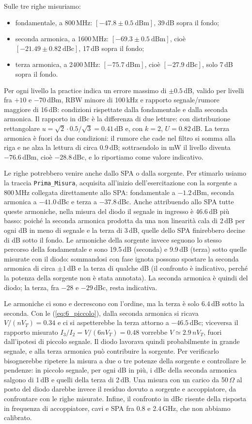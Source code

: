 \documentclass[11pt,a4paper,oneside]{book}
\begin{document}
Sulle tre righe misuriamo:
\begin{itemize}
\item fondamentale, a 800\,MHz: $[-47.8 \pm 0.5\ \mathrm{dBm}]$, 39\,dB sopra il fondo;
\item seconda armonica, a 1600\,MHz: $[-69.3 \pm 0.5\ \mathrm{dBm}]$, cioè $[-21.49 \pm 0.82\ \mathrm{dBc}]$, 17\,dB sopra il fondo;
\item terza armonica, a 2400\,MHz: $[-75.7\ \mathrm{dBm}]$, cioè $[-27.9\ \mathrm{dBc}]$, solo 7\,dB sopra il fondo.
\end{itemize}
Per ogni livello la practice indica un errore massimo di $\pm 0.5$\,dB, valido per livelli fra $+10$ e $-70$\,dBm, RBW minore di 100\,kHz e rapporto segnale/rumore maggiore di 16\,dB: condizioni rispettate dalla fondamentale e dalla seconda armonica. Il rapporto in dBc è la differenza di due letture: con distribuzione rettangolare $u = \sqrt2 \cdot 0.5/\sqrt3 = 0.41$\,dB e, con $k = 2$, $U = 0.82$\,dB. La terza armonica è fuori da due condizioni: il rumore che cade nel filtro si somma alla riga e ne alza la lettura di circa 0.9\,dB; sottraendolo in mW il livello diventa $-76.6$\,dBm, cioè $-28.8$\,dBc, e lo riportiamo come valore indicativo.

Le righe potrebbero venire anche dallo SPA o dalla sorgente. Per stimarlo usiamo la traccia \texttt{Prima\_Misura}, acquisita all'inizio dell'esercitazione con la sorgente a 800\,MHz collegata direttamente allo SPA: fondamentale a $-1.2$\,dBm, seconda armonica a $-41.0$\,dBc e terza a $-37.8$\,dBc. Anche attribuendo allo SPA tutte queste armoniche, nella misura del diodo il segnale in ingresso è 46.6\,dB più basso: poiché la seconda armonica prodotta da una non linearità cala di 2\,dB per ogni dB in meno di segnale e la terza di 3\,dB, quelle dello SPA finirebbero decine di dB sotto il fondo. Le armoniche della sorgente invece seguono lo stesso percorso della fondamentale e sono 19.5\,dB (seconda) e 9.9\,dB (terza) sotto quelle misurate con il diodo: sommandosi con fase ignota possono spostare la seconda armonica di circa $\pm 1$\,dB e la terza di qualche dB (il confronto è indicativo, perché la potenza della sorgente non è stata annotata). La seconda armonica è quindi del diodo; la terza, fra $-28$ e $-29$\,dBc, resta indicativa.

Le armoniche ci sono e decrescono con l'ordine, ma la terza è solo 6.4\,dB sotto la seconda. Con le (\ref{eq:6_piccolo}), dalla seconda armonica si ricava $V/(nV_T) = 0.34$ e ci si aspetterebbe la terza attorno a $-46.5$\,dBc; viceversa il rapporto misurato $I_3/I_2 = V/(6nV_T) = 0.48$ vorrebbe $V \simeq 2.9\,nV_T$, fuori dall'ipotesi di piccolo segnale. Il diodo lavorava quindi probabilmente in grande segnale, e alla terza armonica può contribuire la sorgente. Per verificarlo bisognerebbe ripetere la misura a due o tre potenze della sorgente e controllare le pendenze: in piccolo segnale, per ogni dB in più, i dBc della seconda armonica salgono di 1\,dB e quelli della terza di 2\,dB. Una misura con un carico da 50\,$\Omega$ al posto del diodo darebbe invece il residuo dovuto a sorgente e accoppiatore, da confrontare con le righe misurate. Infine, il confronto in dBc risente della risposta in frequenza di accoppiatore, cavi e SPA fra 0.8 e 2.4\,GHz, che non abbiamo calibrato.
\end{document}

